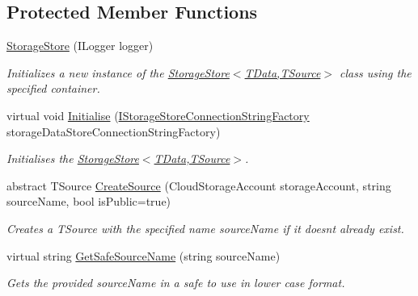 \subsection*{Protected Member Functions}
\begin{DoxyCompactItemize}
\item 
\hyperlink{classCqrs_1_1Azure_1_1BlobStorage_1_1StorageStore_ae7a725cdcb7de73e097b02c19463bae7_ae7a725cdcb7de73e097b02c19463bae7}{Storage\+Store} (I\+Logger logger)
\begin{DoxyCompactList}\small\item\em Initializes a new instance of the \hyperlink{classCqrs_1_1Azure_1_1BlobStorage_1_1StorageStore_ae7a725cdcb7de73e097b02c19463bae7_ae7a725cdcb7de73e097b02c19463bae7}{Storage\+Store$<$\+T\+Data,\+T\+Source$>$} class using the specified container. \end{DoxyCompactList}\item 
virtual void \hyperlink{classCqrs_1_1Azure_1_1BlobStorage_1_1StorageStore_a8d16603267a768190f2c49ca3d1c439e_a8d16603267a768190f2c49ca3d1c439e}{Initialise} (\hyperlink{interfaceCqrs_1_1Azure_1_1BlobStorage_1_1IStorageStoreConnectionStringFactory}{I\+Storage\+Store\+Connection\+String\+Factory} storage\+Data\+Store\+Connection\+String\+Factory)
\begin{DoxyCompactList}\small\item\em Initialises the \hyperlink{classCqrs_1_1Azure_1_1BlobStorage_1_1StorageStore_ae7a725cdcb7de73e097b02c19463bae7_ae7a725cdcb7de73e097b02c19463bae7}{Storage\+Store$<$\+T\+Data,\+T\+Source$>$}. \end{DoxyCompactList}\item 
abstract T\+Source \hyperlink{classCqrs_1_1Azure_1_1BlobStorage_1_1StorageStore_a07903b6c3eca8d49878deb6e2e5719e0_a07903b6c3eca8d49878deb6e2e5719e0}{Create\+Source} (Cloud\+Storage\+Account storage\+Account, string source\+Name, bool is\+Public=true)
\begin{DoxyCompactList}\small\item\em Creates a {\itshape T\+Source}  with the specified name {\itshape source\+Name}  if it doesn\textquotesingle{}t already exist. \end{DoxyCompactList}\item 
virtual string \hyperlink{classCqrs_1_1Azure_1_1BlobStorage_1_1StorageStore_a3ed119d808d9b29e99b1c6c983831482_a3ed119d808d9b29e99b1c6c983831482}{Get\+Safe\+Source\+Name} (string source\+Name)
\begin{DoxyCompactList}\small\item\em Gets the provided {\itshape source\+Name}  in a safe to use in lower case format. \end{DoxyCompactList}\item 

\end{DoxyCompactItemize}
